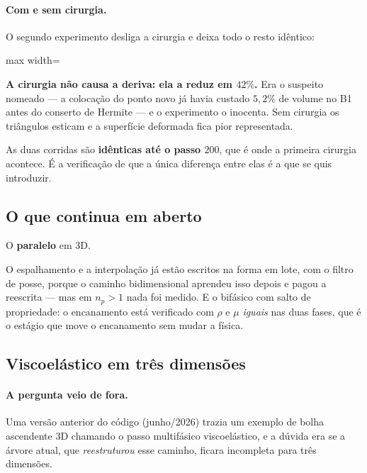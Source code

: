 \paragraph{Com e sem cirurgia.} O segundo experimento desliga a cirurgia e deixa
todo o resto id\^entico:

\begin{adjustbox}{max width=\linewidth}
\end{adjustbox}

\textbf{A cirurgia n\~ao causa a deriva: ela a reduz em $42\%$.} Era o suspeito
nomeado --- a coloca\c{c}\~ao do ponto novo j\'a havia custado $5{,}2\%$ de
volume no B1 antes do conserto de Hermite --- e o experimento o inocenta. Sem
cirurgia os tri\^angulos esticam e a superf\'icie deformada fica pior
representada.

As duas corridas s\~ao \textbf{id\^enticas at\'e o passo $200$}, que \'e onde a
primeira cirurgia acontece. \'E a verifica\c{c}\~ao de que a \'unica diferen\c{c}a
entre elas \'e a que se quis introduzir.

\subsection{O que continua em aberto}

O \textbf{paralelo} em 3D.

O espalhamento e a
interpola\c{c}\~ao j\'a est\~ao escritos na forma em lote, com o filtro de posse,
porque o caminho bidimensional aprendeu isso depois e pagou a reescrita --- mas
em $n_p>1$ nada foi medido. E o bif\'asico com salto de propriedade: o
encanamento est\'a verificado com $\rho$ e $\mu$ \emph{iguais} nas duas fases, que
\'e o est\'agio que move o encanamento sem mudar a f\'isica.

\subsection{Viscoel\'astico em tr\^es dimens\~oes}
\label{sec:tridim-ve}

\paragraph{A pergunta veio de fora.} Uma vers\~ao anterior do c\'odigo
(junho/2026) trazia um exemplo de bolha ascendente 3D chamando o passo
multif\'asico viscoel\'astico, e a d\'uvida era se a \'arvore atual, que
\emph{reestruturou} esse caminho, ficara incompleta para tr\^es dimens\~oes.

